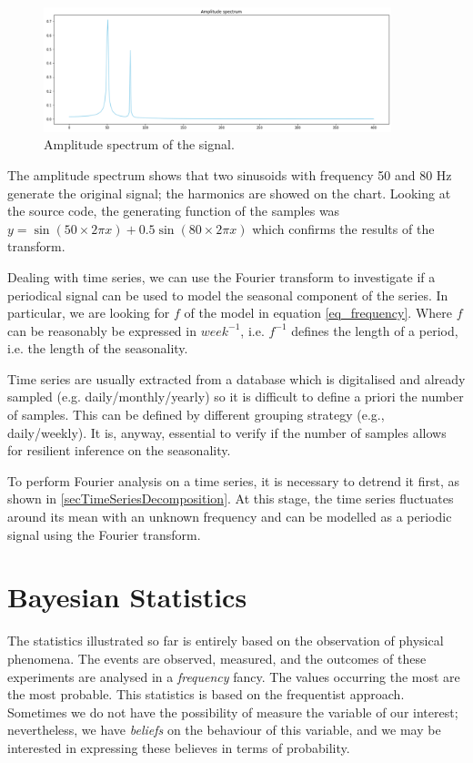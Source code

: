 \begin{figure}[hbt!]
\centering
\includegraphics[width=0.9\textwidth]{SectionLetsMath/elemStat_figures/fig_Fourier.png}
\captionsetup{type=figure}
\caption{Amplitude spectrum of the signal.}
\label{fig_Fourier}
\end{figure}

The amplitude spectrum shows that two sinusoids with frequency 50 and 80 Hz generate the original signal; the harmonics are showed on the chart. Looking at the source code, the generating function of the samples was $y=\sin{\left(50 \times 2\pi x\right)}+0.5\sin(80\times2\pi x)$ which confirms the results of the transform.\par

Dealing with time series, we can use the Fourier transform to investigate if a periodical signal can be used to model the seasonal component of the series. In particular, we are looking for $f$ of the model in equation \ref{eq_frequency}. Where $f$ can be reasonably be expressed in $week^{-1}$, i.e. $f^{-1}$ defines the length of a period, i.e. the length of the seasonality.\par

Time series are usually extracted from a database which is digitalised and already sampled (e.g. daily/monthly/yearly) so it is difficult to define a priori the number of samples. This can be defined by different grouping strategy (e.g., daily/weekly). It is, anyway, essential to verify if the number of samples allows for resilient inference on the seasonality.\par

To perform Fourier analysis on a time series, it is necessary to detrend it first, as shown in \ref{secTimeSeriesDecomposition}. At this stage, the time series fluctuates around its mean with an unknown frequency and can be modelled as a periodic signal using the Fourier transform. 

\section{Bayesian Statistics} \label{secBayesTheorem}
The statistics illustrated so far is entirely based on the observation of physical phenomena. The events are observed, measured, and the outcomes of these experiments are analysed in a \textit{frequency} fancy. The values occurring the most are the most probable. This statistics is based on the frequentist approach. Sometimes we do not have the possibility of measure the variable of our interest; nevertheless, we have \textit{beliefs} on the behaviour of this variable, and we may be interested in expressing these believes in terms of probability. \par

